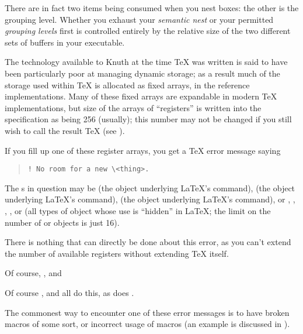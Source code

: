 There are in fact two items being consumed when you nest boxes: the
other is the grouping level.  Whether you exhaust your %
\emph{semantic nest} or your permitted \emph{grouping levels} first is
controlled entirely by the relative size of the two different sets of
buffers in your \AllTeX{} executable.


The technology available to Knuth at the time \TeX{} was written is
said to have been particularly poor at managing dynamic storage; as a
result much of the storage used within \TeX{} is allocated as fixed
arrays, in the reference implementations.  Many of these fixed arrays
are expandable in modern \TeX{} implementations, but size of the
arrays of ``registers'' is written into the specification as being 256
(usually); this number may not be changed if you still wish to call
the result \TeX{}
(see ).

If you fill up one of these register arrays, you get a \TeX{} error
message saying
\begin{quote}
\begin{verbatim}
! No room for a new \<thing>.
\end{verbatim}
\end{quote}
The s in question may be  (the object underlying
\LaTeX{}'s  command),  (the object underlying
\LaTeX{}'s  command),  (the object underlying
\LaTeX{}'s  command), or , ,
, ,  or  (all types of object
whose use is ``hidden'' in \LaTeX{}; the limit on the number of
 or  objects is just 16).

There is nothing that can directly be done about this error, as you can't
extend the number of available registers without extending \TeX{}
itself.
\begin{htmlversion}
  Of course, ,  and
\end{htmlversion}
\htmlignore
  Of course ,
   and
\endhtmlignore
all do this, as does .

The commonest way to encounter one of these error messages is to have
broken macros of some sort, or incorrect usage of macros (an example
is discussed in ).


